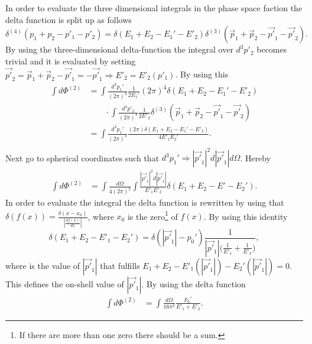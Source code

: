 In order to evaluate the three dimensional integrals in the phase space faction the delta function is split up as follows
\begin{equation}
	\delta^{(4)}(p_1+p_2-p'_1-p'_2)=\delta(E_1+E_2-E_1'-E'_2)\delta^{(3)}(\vec{p}_1+\vec{p}_2-\vec{p'}_1-\vec{p'}_2).
\end{equation} 
By using the three-dimensional delta-function the integral over $d^3p'_2$ becomes trivial and it is evaluated by setting $\vec{p'}_2=\vec{p}_1+\vec{p}_2-\vec{p'}_1=-\vec{p'}_1\Rightarrow E'_2=E'_2(p'_1)$. By using this
\begin{equation}
	\begin{split}
		\int d\Phi^{(2)}&=\int\frac{d^3p_1'}{(2\pi)^3}\frac{1}{2E_1 '}(2\pi)^4\delta(E_1+E_2-E_1'-E'_2)\\
		&\qquad\cdot\int\frac{d^3p'_2}{(2\pi)^3}\frac{1}{2E'_2}\delta^{(3)}(\vec{p}_1+\vec{p}_2-\vec{p'}_1-\vec{p'}_2)\\
		&=\int\frac{d^3p_1'}{(2\pi)^3}\frac{(2\pi)\delta(E_1+E_2-E_1'-E'_2)}{4E'_1E_2'}.\\
	\end{split}
\end{equation} 
Next go to spherical coordinates such that $d^3p_1'\Rightarrow |\vec{p'}_1|^2d|\vec{p'}_1|d\Omega$. Hereby
\begin{equation}
	\begin{split}
		\int d\Phi^{(2)}&=\int\frac{d\Omega}{4(2\pi)^2}   \int\frac{|\vec{p'}_1|^2d|\vec{p'}_1|}{E'_1E'_2}\delta(E_1+E_2-E'-E_2').
	\end{split}
\end{equation} 
In order to evaluate the integral the delta function is rewritten by using that $\delta(f(x))=\frac{\delta(x-x_0)}{|\frac{df(x)}{dx}|}$, where $x_0$ is the zero\footnote{If there are more than one zero there should be a sum.} of $f(x)$. By using this identity
\begin{equation}
	\delta(E_1+E_2-E'_1-E_2')=\delta(|\vec{p'}_1|-p_0')\frac{1}{|\vec{p'}_1|\big(\frac{1}{E'_1}+\frac{1}{E'_2}\big)},
\end{equation} 
where is the value of $|\vec{p'}_1|$ that fulfills $E_1+E_2-E'_1(|\vec{p'}_1|)-E_2'(|\vec{p'}_1|)=0$. This defines the on-shell value of $|\vec{p'}_1|$. By using the delta function
\begin{equation}
	\begin{split}
		\int d\Phi^{(2)}&=\int\frac{d\Omega}{16\pi^2}   \frac{p_0'}{E'_1+E'_2}.
		\end{split}
	\label{eq:phase-space-integral}
\end{equation} 
